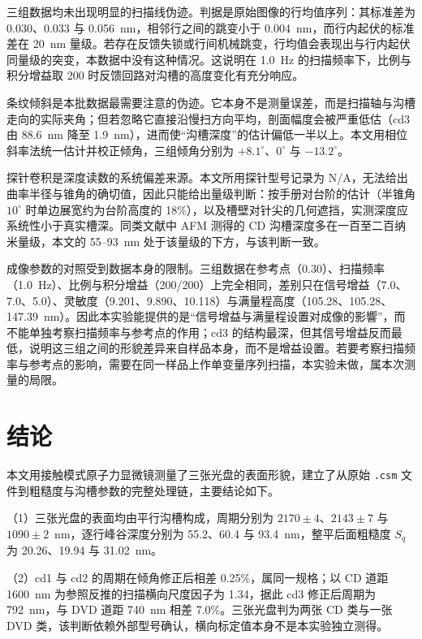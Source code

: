 三组数据均未出现明显的扫描线伪迹。判据是原始图像的行均值序列：其标准差为 0.030、0.033 与 0.056~nm，相邻行之间的跳变小于 0.004~nm，而行内起伏的标准差在 20~nm 量级。若存在反馈失锁或行间机械跳变，行均值会表现出与行内起伏同量级的突变，本数据中没有这种情况。这说明在 1.0~Hz 的扫描频率下，比例与积分增益取 200 时反馈回路对沟槽的高度变化有充分响应。

条纹倾斜是本批数据最需要注意的伪迹。它本身不是测量误差，而是扫描轴与沟槽走向的实际夹角；但若忽略它直接沿慢扫方向平均，剖面幅度会被严重低估（cd3 由 88.6~nm 降至 1.9~nm），进而使“沟槽深度”的估计偏低一半以上。本文用相位斜率法统一估计并校正倾角，三组倾角分别为 $+8.1^\circ$、$0^\circ$ 与 $-13.2^\circ$。

探针卷积是深度读数的系统偏差来源。本文所用探针型号记录为 N/A，无法给出曲率半径与锥角的确切值，因此只能给出量级判断：按手册对台阶的估计（半锥角 $10^\circ$ 时单边展宽约为台阶高度的 18\%），以及槽壁对针尖的几何遮挡，实测深度应系统性小于真实槽深。同类文献中 AFM 测得的 CD 沟槽深度多在一百至二百纳米量级，本文的 55--93~nm 处于该量级的下方，与该判断一致。

成像参数的对照受到数据本身的限制。三组数据在参考点（0.30）、扫描频率（1.0~Hz）、比例与积分增益（200/200）上完全相同，差别只在信号增益（7.0、7.0、5.0）、灵敏度（9.201、9.890、10.118）与满量程高度（105.28、105.28、147.39~nm）。因此本实验能提供的是“信号增益与满量程设置对成像的影響”，而不能单独考察扫描频率与参考点的作用；cd3 的结构最深，但其信号增益反而最低，说明这三组之间的形貌差异来自样品本身，而不是增益设置。若要考察扫描频率与参考点的影响，需要在同一样品上作单变量序列扫描，本实验未做，属本次测量的局限。

\section{结论}

本文用接触模式原子力显微镜测量了三张光盘的表面形貌，建立了从原始 \texttt{.csm} 文件到粗糙度与沟槽参数的完整处理链，主要结论如下。

（1）三张光盘的表面均由平行沟槽构成，周期分别为 $2170\pm4$、$2143\pm7$ 与 $1090\pm2$~nm，逐行峰谷深度分别为 55.2、60.4 与 93.4~nm，整平后面粗糙度 $S_q$ 为 20.26、19.94 与 31.02~nm。

（2）cd1 与 cd2 的周期在倾角修正后相差 0.25\%，属同一规格；以 CD 道距 1600~nm 为参照反推的扫描横向尺度因子为 1.34，据此 cd3 修正后周期为 792~nm，与 DVD 道距 740~nm 相差 7.0\%。三张光盘判为两张 CD 类与一张 DVD 类，该判断依赖外部型号确认，横向标定值本身不是本实验独立测得。

